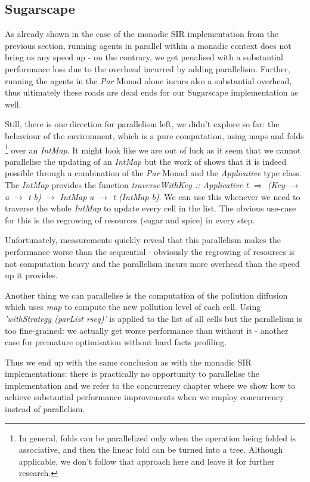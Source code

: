 \subsection{Sugarscape}
As already shown in the case of the monadic SIR implementation from the previous section, running agents in parallel within a monadic context does not bring us any speed up - on the contrary, we get penalised with a substantial performance loss due to the overhead incurred by adding parallelism. Further, running the agents in the \textit{Par} Monad alone incurs also a substantial overhead, thus ultimately these roads are dead ends for our Sugarscape implementation as well.

Still, there is one direction for parallelism left, we didn't explore so far: the behaviour of the environment, which is a pure computation, using maps and folds \footnote{In general, folds can be parallelized only when the operation being folded is associative, and then the linear fold can be turned into a tree. Although applicable, we don't follow that approach here and leave it for further research.} over an \textit{IntMap}. It might look like we are out of luck as it seem that we cannot parallelise the updating of an \textit{IntMap} but the work of \cite{marlow_parallel_2013} shows that it is indeed possible through a combination of the \textit{Par} Monad and the \textit{Applicative} type class. The \textit{IntMap} provides the function \textit{traverseWithKey :: Applicative t $\Rightarrow$ (Key $\rightarrow$ a $\rightarrow$ t b) $\rightarrow$ IntMap a $\rightarrow$ t (IntMap b)}. We can use this whenever we need to traverse the whole \textit{IntMap} to update every cell in the list. The obvious use-case for this is the regrowing of resources (sugar and spice) in every step.

Unfortunately, measurements quickly reveal that this parallelism makes the performance worse than the sequential - obviously the regrowing of resources is not computation heavy and the parallelism incurs more overhead than the speed up it provides.

Another thing we can parallelise is the computation of the pollution diffusion which uses \textit{map} to compute the new pollution level of each cell. Using \textit{'withStrategy (parList rseq)'} is applied to the list of all cells but the parallelism is too fine-grained: we actually get worse performance than without it - another case for premature optimisation without hard facts profiling.

Thus we end up with the same conclusion as with the monadic SIR implementations: there is practically no opportunity to parallelise the implementation and we refer to the concurrency chapter where we show how to achieve substantial performance improvements when we employ concurrency instead of parallelism.